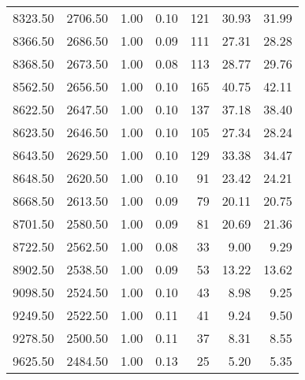 \begin{table}
\begin{tabular}{rrrrrrr}
8323.50 & 2706.50 & 1.00 & 0.10 & 121 & 30.93 & 31.99 \\
8366.50 & 2686.50 & 1.00 & 0.09 & 111 & 27.31 & 28.28 \\
8368.50 & 2673.50 & 1.00 & 0.08 & 113 & 28.77 & 29.76 \\
8562.50 & 2656.50 & 1.00 & 0.10 & 165 & 40.75 & 42.11 \\
8622.50 & 2647.50 & 1.00 & 0.10 & 137 & 37.18 & 38.40 \\
8623.50 & 2646.50 & 1.00 & 0.10 & 105 & 27.34 & 28.24 \\
8643.50 & 2629.50 & 1.00 & 0.10 & 129 & 33.38 & 34.47 \\
8648.50 & 2620.50 & 1.00 & 0.10 & 91 & 23.42 & 24.21 \\
8668.50 & 2613.50 & 1.00 & 0.09 & 79 & 20.11 & 20.75 \\
8701.50 & 2580.50 & 1.00 & 0.09 & 81 & 20.69 & 21.36 \\
8722.50 & 2562.50 & 1.00 & 0.08 & 33 & 9.00 & 9.29 \\
8902.50 & 2538.50 & 1.00 & 0.09 & 53 & 13.22 & 13.62 \\
9098.50 & 2524.50 & 1.00 & 0.10 & 43 & 8.98 & 9.25 \\
9249.50 & 2522.50 & 1.00 & 0.11 & 41 & 9.24 & 9.50 \\
9278.50 & 2500.50 & 1.00 & 0.11 & 37 & 8.31 & 8.55 \\
9625.50 & 2484.50 & 1.00 & 0.13 & 25 & 5.20 & 5.35 \\
\bottomrule
\end{tabular}
\end{table}
